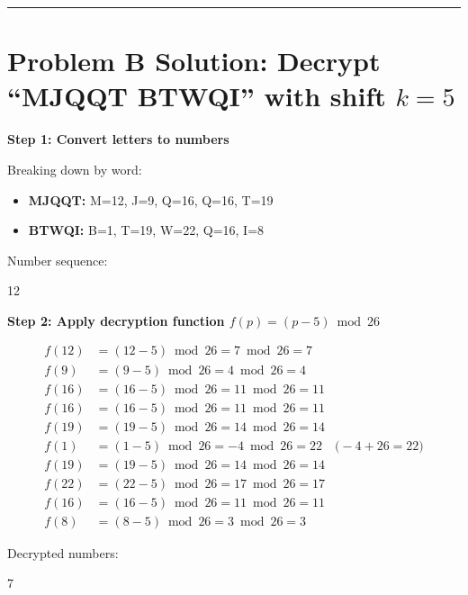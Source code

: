\documentclass[12pt]{article}
\begin{document}
\vspace{0.8cm}
\hrule
\vspace{0.8cm}

\section*{Problem B Solution: Decrypt ``MJQQT BTWQI'' with shift $k=5$}

\textbf{Step 1: Convert letters to numbers}

Breaking down by word:
\begin{itemize}[leftmargin=*]
\item \textbf{MJQQT:} M=12, J=9, Q=16, Q=16, T=19
\item \textbf{BTWQI:} B=1, T=19, W=22, Q=16, I=8
\end{itemize}

Number sequence: 
\begin{center}
12         
\end{center}

\vspace{0.3cm}

\textbf{Step 2: Apply decryption function $f(p) = (p - 5) \bmod 26$}

\begin{align*}
f(12) &= (12 - 5) \bmod 26 = 7 \bmod 26 = 7 \\
f(9) &= (9 - 5) \bmod 26 = 4 \bmod 26 = 4 \\
f(16) &= (16 - 5) \bmod 26 = 11 \bmod 26 = 11 \\
f(16) &= (16 - 5) \bmod 26 = 11 \bmod 26 = 11 \\
f(19) &= (19 - 5) \bmod 26 = 14 \bmod 26 = 14 \\
f(1) &= (1 - 5) \bmod 26 = -4 \bmod 26 = 22 \quad \text{(} -4 + 26 = 22\text{)} \\
f(19) &= (19 - 5) \bmod 26 = 14 \bmod 26 = 14 \\
f(22) &= (22 - 5) \bmod 26 = 17 \bmod 26 = 17 \\
f(16) &= (16 - 5) \bmod 26 = 11 \bmod 26 = 11 \\
f(8) &= (8 - 5) \bmod 26 = 3 \bmod 26 = 3
\end{align*}

Decrypted numbers:
\begin{center}
7         
\end{center}
\end{document}
